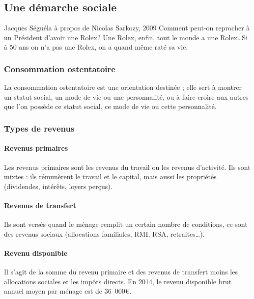 \documentclass[10pt,a4paper,french]{article}
\begin{document}
\subsection{Une démarche sociale}

\begin{cquote}{Jacques Séguéla à propos de Nicolas Sarkozy, 2009}
Comment peut-on reprocher à un Président d'avoir une Rolex? Une Rolex, enfin, tout le monde a une Rolex\ldots Si à 50 ans on n'a pas une Rolex, on a quand même raté sa vie.~
\end{cquote}

\subsubsection{Consommation ostentatoire}

La consommation ostentatoire est une orientation destinée ; elle sert à montrer un statut social, un mode de vie ou une personnalité, ou à faire croire aux autres que l'on possède ce statut social, ce mode de vie ou cette personnalité.

\subsubsection{Types de revenus}

\paragraph{Revenus primaires}
Les revenus primaires sont les revenus du travail ou les revenus d'activité. Ils sont mixtes : ils rémunèrent le travail et le capital, mais aussi les propriétés (dividendes, intérêts, loyers perçus).

\paragraph{Revenus de transfert}
Ils sont versés quand le ménage remplit un certain nombre de conditions, ce sont des revenus sociaux (allocations familiales, RMI, RSA, retraites\ldots).

\paragraph{Revenu disponible}
Il s'agit de la somme du revenu primaire et des revenus de transfert moins les allocations sociales et les impôts directs. En 2014, le revenu disponible brut annuel moyen par ménage est de 36~000\euro.
\end{document}
